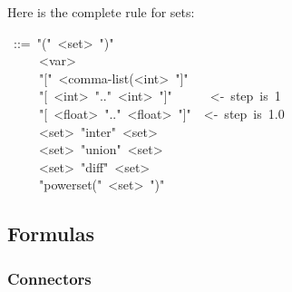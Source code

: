 Here is the complete rule for sets:%
\begin{mdpre}%
~::=~"("~{\textless{}set\textgreater{}}~")"\\
~~~~\textbar{}~{\textless{}var\textgreater{}}\\
~~~~\textbar{}~"{}["~{\textless{}comma-list(\textless{}int\textgreater{}}~"]"\\
~~~~\textbar{}~"{}[~{\textless{}int\textgreater{}}~".."~{\textless{}int\textgreater{}}~"]"~~~~~~{\textless{}-~step~is~1}\\
~~~~\textbar{}~"{}[~{\textless{}float\textgreater{}}~".."~{\textless{}float\textgreater{}}~"]"~~{\textless{}-~step~is~1.0}\\
~~~~\textbar{}~{\textless{}set\textgreater{}}~"inter"~{\textless{}set\textgreater{}}\\
~~~~\textbar{}~{\textless{}set\textgreater{}}~"union"~{\textless{}set\textgreater{}}\\
~~~~\textbar{}~{\textless{}set\textgreater{}}~"diff"~{\textless{}set\textgreater{}}\\
~~~~\textbar{}~"powerset("~{\textless{}set\textgreater{}}~")"%
\end{mdpre}
\subsection{Formulas}\label{sec-formulas}%

\subsubsection{Connectors}\label{sec-connectors}%


